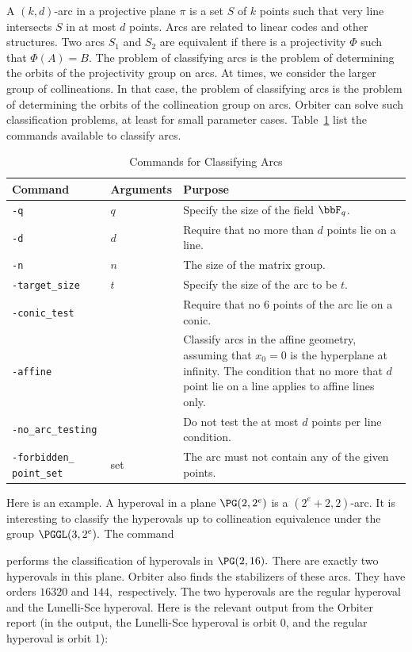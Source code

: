 A $(k,d)$-arc in a projective plane $\pi$ 
is a set $S$ of $k$ points such that very line intersects $S$ in at most $d$ 
points. Arcs are related to linear codes and other structures. Two arcs $S_1$ and $S_2$ 
are equivalent if there is a projectivity $\Phi$ such that $\Phi(A) = B.$ The problem of classifying arcs 
is the problem of determining the orbits of the projectivity group on arcs. At times, 
we consider the larger group of collineations. In that case, the problem of classifying arcs is the 
problem of determining the orbits of the collineation group on arcs. 
Orbiter can solve such classification problems, at least for small parameter cases. 
Table~\ref{tab:arcs} list the commands available to classify arcs.
\begin{table}
\begin{center}
\begin{tabular}{|p{4cm}|p{3cm}|p{8cm}|}
\hline
Command  & Arguments & Purpose \\
\hline
\hline
\verb'-q' & $q$ & Specify the size of the field $\bbF_q$. \\
\hline
\verb'-d' & $d$ & Require that no more than $d$ points lie on a line. \\
\hline
\verb'-n' & $n$ & The size of the matrix group. \\
\hline
\verb'-target_size' & $t$ & Specify the size of the arc to be $t$. \\
\hline
\verb'-conic_test' & & Require that no $6$ points of the arc lie on a conic. \\
\hline
\verb'-affine' & & Classify arcs in the affine geometry, assuming that $x_0 = 0$ is the hyperplane at infinity. The condition that no more that $d$ point lie on a line applies to affine lines only. \\
\hline
\verb'-no_arc_testing' & & Do not test the at most $d$ points per line condition. \\
\hline
\verb'-forbidden_' \verb'point_set' & set & The arc must not contain any of the given points. \\
\hline
\end{tabular}
\end{center}
\caption{\label{tab:arcs}Commands for Classifying Arcs}
\end{table}
Here is an example. A hyperoval in a plane $\PG(2,2^e)$ is a $(2^e + 2,2)$-arc. 
It is interesting to classify the hyperovals up to collineation equivalence under the group $\PGGL(3,2^e).$ 
The command 
{\tt

}
performs the classification of hyperovals in $\PG(2,16).$ 
There are exactly two hyperovals in this plane. 
Orbiter also finds the stabilizers of these arcs. 
They have orders $16320$ and $144,$ respectively.
The two hyperovals are the regular hyperoval and the Lunelli-Sce hyperoval. 
Here is the relevant output from the Orbiter report 
(in the output, the Lunelli-Sce hyperoval is orbit 0, and the 
regular hyperoval is orbit 1):
\begin{mdframed}[style=MyFrame]

\end{mdframed}


